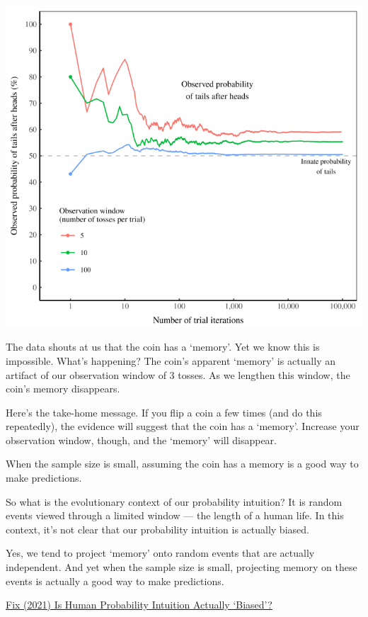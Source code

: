 \documentclass[
]{book}
\begin{document}
\includegraphics{fig/tails_after_head_by_multi_tosses.png}

The data shouts at us that the coin has a `memory'. Yet we know this is impossible. What's happening?
The coin's apparent `memory' is actually an artifact of our observation window of 3 tosses. As we lengthen this window, the coin's memory disappears.

Here's the take-home message. If you flip a coin a few times (and do this repeatedly), the evidence will suggest that the coin has a `memory'. Increase your observation window, though, and the `memory' will disappear.

When the sample size is small, assuming the coin has a memory is a good way to make predictions.

So what is the evolutionary context of our probability intuition? It is random events viewed through a limited window --- the length of a human life. In this context, it's not clear that our probability intuition is actually biased.

Yes, we tend to project `memory' onto random events that are actually independent. And yet when the sample size is small, projecting memory on these events is actually a good way to make predictions.

\href{https://economicsfromthetopdown.com/2021/07/09/is-human-probability-intuition-actually-biased/}{Fix (2021) Is Human Probability Intuition Actually `Biased'?}
\end{document}
